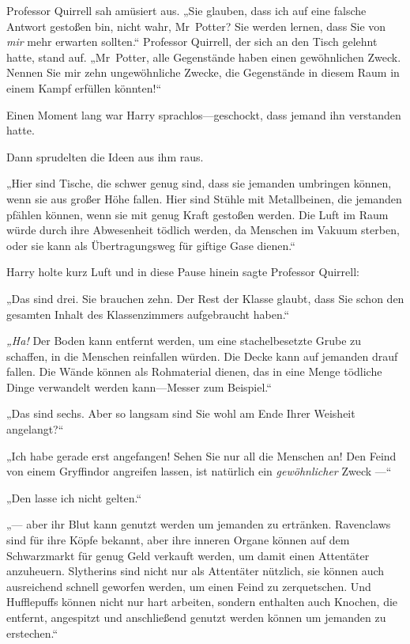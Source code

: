 {Professor Quirrell sah amüsiert aus. „Sie glauben, dass ich auf eine falsche Antwort gestoßen bin, nicht wahr, Mr~Potter? Sie werden lernen, dass Sie von \emph{mir} mehr erwarten sollten.“ Professor Quirrell, der sich an den Tisch gelehnt hatte, stand auf. „Mr~Potter, alle Gegenstände haben einen gewöhnlichen Zweck. Nennen Sie mir zehn ungewöhnliche Zwecke, die Gegenstände in diesem Raum in einem Kampf erfüllen könnten!“

Einen Moment lang war Harry sprachlos—geschockt, dass jemand ihn verstanden hatte.

Dann sprudelten die Ideen aus ihm raus.

„Hier sind Tische, die schwer genug sind, dass sie jemanden umbringen können, wenn sie aus großer Höhe fallen. Hier sind Stühle mit Metallbeinen, die jemanden pfählen können, wenn sie mit genug Kraft gestoßen werden. Die Luft im Raum würde durch ihre Abwesenheit tödlich werden, da Menschen im Vakuum sterben, oder sie kann als Übertragungsweg für giftige Gase dienen.“

Harry holte kurz Luft und in diese Pause hinein sagte Professor Quirrell:

„Das sind drei. Sie brauchen zehn. Der Rest der Klasse glaubt, dass Sie schon den gesamten Inhalt des Klassenzimmers aufgebraucht haben.“

\emph{„Ha!} Der Boden kann entfernt werden, um eine stachelbesetzte Grube zu schaffen, in die Menschen reinfallen würden. Die Decke kann auf jemanden drauf fallen. Die Wände können als Rohmaterial dienen, das in eine Menge tödliche Dinge verwandelt werden kann—Messer zum Beispiel.“

„Das sind sechs. Aber so langsam sind Sie wohl am Ende Ihrer Weisheit angelangt?“

„Ich habe gerade erst angefangen! Sehen Sie nur all die Menschen an! Den Feind von einem Gryffindor angreifen lassen, ist natürlich ein \emph{gewöhnlicher} Zweck —“

„Den lasse ich nicht gelten.“

„— aber ihr Blut kann genutzt werden um jemanden zu ertränken. Ravenclaws sind für ihre Köpfe bekannt, aber ihre inneren Organe können auf dem Schwarzmarkt für genug Geld verkauft werden, um damit einen Attentäter anzuheuern. Slytherins sind nicht nur als Attentäter nützlich, sie können auch ausreichend schnell geworfen werden, um einen Feind zu zerquetschen. Und Hufflepuffs können nicht nur hart arbeiten, sondern enthalten auch Knochen, die entfernt, angespitzt und anschließend genutzt werden können um jemanden zu erstechen.“

}
